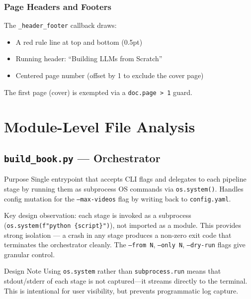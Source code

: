 \documentclass[11pt,a4paper]{article}
\begin{document}
\subsubsection{Page Headers and Footers}

The \texttt{\_header\_footer} callback draws:
\begin{itemize}
    \item A red rule line at top and bottom (0.5pt)
    \item Running header: ``Building LLMs from Scratch''
    \item Centered page number (offset by 1 to exclude the cover page)
\end{itemize}
The first page (cover) is exempted via a \texttt{doc.page > 1} guard.

\section{Module-Level File Analysis}

\subsection{\texttt{build\_book.py} --- Orchestrator}

\begin{designbox}{Purpose}
Single entrypoint that accepts CLI flags and delegates to each pipeline stage by running them as subprocess OS commands via \texttt{os.system()}. Handles config mutation for the \texttt{--max-videos} flag by writing back to \texttt{config.yaml}.
\end{designbox}

Key design observation: each stage is invoked as a subprocess (\texttt{os.system(f"python \{script\}")}), not imported as a module. This provides strong isolation --- a crash in any stage produces a non-zero exit code that terminates the orchestrator cleanly. The \texttt{--from N}, \texttt{--only N}, \texttt{--dry-run} flags give granular control.

\begin{warnbox}{Design Note}
Using \texttt{os.system} rather than \texttt{subprocess.run} means that stdout/stderr of each stage is not captured---it streams directly to the terminal. This is intentional for user visibility, but prevents programmatic log capture.
\end{warnbox}
\end{document}
